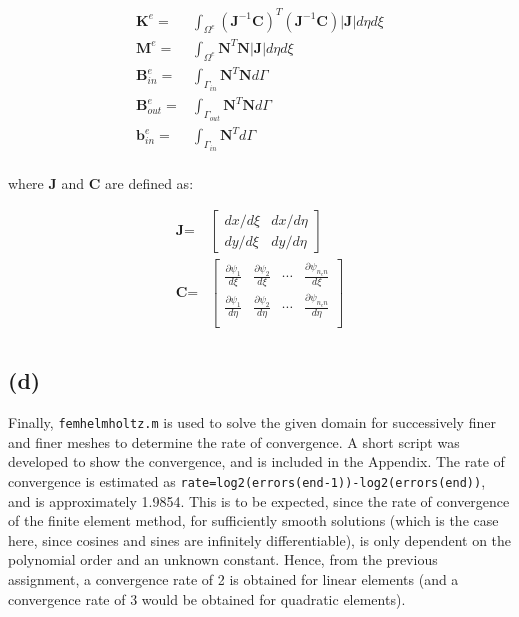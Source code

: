 \documentclass[10pt]{article}
\newcommand{\beqa}{\begin{equation}\begin{aligned}}
\newcommand{\eeqa}{\end{aligned}\end{equation}}
\begin{document}
\beqa
\label{eq:Matrices}
\textbf{K}^e=&\int_{\Omega^e}(\textbf{J}^{-1}\textbf{C})^T(\textbf{J}^{-1}\textbf{C})|\textbf{J}|d\eta d\xi\\
\textbf{M}^e=&\int_{\Omega^e}\textbf{N}^T\textbf{N}|\textbf{J}|d\eta d\xi\\
\textbf{B}_{in}^e=&\int_{\Gamma_{in}}\textbf{N}^T\textbf{N}d\Gamma\\
\textbf{B}_{out}^e=&\int_{\Gamma_{out}}\textbf{N}^T\textbf{N}d\Gamma\\
\textbf{b}_{in}^e=&\int_{\Gamma_{in}}\textbf{N}^Td\Gamma\\
\eeqa

where \textbf{J} and \textbf{C} are defined as:

\beqa
\textbf{J}=&\begin{bmatrix}dx/d\xi & dx/d\eta\\ dy/d\xi & dy/d\eta\end{bmatrix}\\
\textbf{C}=&\begin{bmatrix}
\frac{\partial\psi_1}{d\xi} & \frac{\partial\psi_2}{d\xi} & \cdots & \frac{\partial\psi_{n_en}}{d\xi}\\
\frac{\partial\psi_1}{d\eta} & \frac{\partial\psi_2}{d\eta} & \cdots & \frac{\partial\psi_{n_en}}{d\eta}\\
\end{bmatrix}\\ 
\eeqa

\subsection{(d)}

Finally, {\tt femhelmholtz.m} is used to solve the given domain for successively finer and finer meshes to determine the rate of convergence. A short script was developed to show the convergence, and is included in the Appendix. The rate of convergence is estimated as {\tt rate=log2(errors(end-1))-log2(errors(end))}, and is approximately 1.9854. This is to be expected, since the rate of convergence of the finite element method, for sufficiently smooth solutions (which is the case here, since cosines and sines are infinitely differentiable), is only dependent on the polynomial order and an unknown constant. Hence, from the previous assignment, a convergence rate of 2 is obtained for linear elements (and a convergence rate of 3 would be obtained for quadratic elements).
\end{document}
